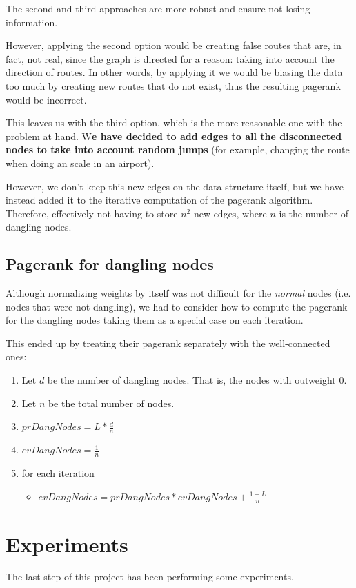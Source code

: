 \documentclass[10pt, a4paper]{article}
\begin{document}
The second and third approaches are more robust and ensure not losing information.

However, applying the second option would be creating false routes that are, in fact, not real, since the graph is directed for a reason: taking into account the direction of routes. In other words, by applying it  we would be biasing the data too much by creating new routes that do not exist, thus the resulting pagerank would be incorrect.

This leaves us with the third option, which is the more reasonable one  with the problem at hand.  W\textbf{e have decided to add edges to all the disconnected nodes to take into account random jumps} (for example, changing the route when doing an scale in an airport). 

However, we don't keep this new edges on the data structure itself, but we have instead added it to the iterative computation of the pagerank algorithm. Therefore, effectively not having to store  $n^2$ new edges, where $n$ is the number of dangling nodes.

\subsection{Pagerank for dangling nodes}
Although normalizing weights by itself was not difficult for the \textit{normal} nodes (i.e. nodes that were not dangling), we had to consider how to compute the pagerank for the dangling nodes taking them as a special case on each iteration.

This ended up by treating their pagerank separately with the well-connected ones:
\begin{enumerate}
    \item Let $d$ be the number of dangling nodes. That is, the nodes with outweight 0.
    \item Let $n$ be the total number of nodes.
    \item $prDangNodes = L * \frac{d}{n}$
    \item $evDangNodes = \frac{1}{n}$
    \item for each iteration
    \begin{itemize}
        \item $evDangNodes = prDangNodes * evDangNodes + \frac{1 - L}{n}$
    \end{itemize}
\end{enumerate}


\section{Experiments}
The last step of this project has been performing some experiments.
\end{document}
